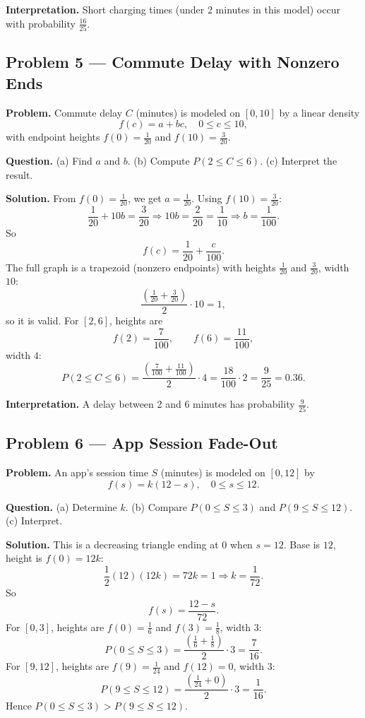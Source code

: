 \begin{ExamProblems}
\textbf{Interpretation.}
Short charging times (under 2 minutes in this model) occur with probability $\frac{16}{25}$.


\item
\subsection*{Problem 5 — Commute Delay with Nonzero Ends}

\textbf{Problem.}
Commute delay $C$ (minutes) is modeled on $[0,10]$ by a linear density
\[
f(c)=a+bc,\quad 0\le c\le 10,
\]
with endpoint heights $f(0)=\frac{1}{20}$ and $f(10)=\frac{3}{20}$.

\textbf{Question.}
(a) Find $a$ and $b$. (b) Compute $P(2\le C\le 6)$. (c) Interpret the result.

\textbf{Solution.}
From $f(0)=\frac{1}{20}$, we get $a=\frac{1}{20}$.
Using $f(10)=\frac{3}{20}$:
\[
\frac{1}{20}+10b=\frac{3}{20}\Rightarrow 10b=\frac{2}{20}=\frac{1}{10}\Rightarrow b=\frac{1}{100}.
\]
So
\[
f(c)=\frac{1}{20}+\frac{c}{100}.
\]
The full graph is a trapezoid (nonzero endpoints) with heights $\frac{1}{20}$ and $\frac{3}{20}$, width $10$:
\[
\frac{\left(\frac{1}{20}+\frac{3}{20}\right)}{2}\cdot 10=1,
\]
so it is valid.
For $[2,6]$, heights are
\[
f(2)=\frac{7}{100},\qquad f(6)=\frac{11}{100},
\]
width $4$:
\[
P(2\le C\le 6)=\frac{\left(\frac{7}{100}+\frac{11}{100}\right)}{2}\cdot 4
=\frac{18}{100}\cdot 2=\frac{9}{25}=0.36.
\]

\textbf{Interpretation.}
A delay between 2 and 6 minutes has probability $\frac{9}{25}$.


\item
\subsection*{Problem 6 — App Session Fade-Out}

\textbf{Problem.}
An app's session time $S$ (minutes) is modeled on $[0,12]$ by
\[
f(s)=k(12-s),\quad 0\le s\le 12.
\]

\textbf{Question.}
(a) Determine $k$. (b) Compare $P(0\le S\le 3)$ and $P(9\le S\le 12)$. (c) Interpret.

\textbf{Solution.}
This is a decreasing triangle ending at 0 when $s=12$.
Base is $12$, height is $f(0)=12k$:
\[
\frac12(12)(12k)=72k=1\Rightarrow k=\frac{1}{72}.
\]
So
\[
f(s)=\frac{12-s}{72}.
\]
For $[0,3]$, heights are $f(0)=\frac16$ and $f(3)=\frac18$, width $3$:
\[
P(0\le S\le 3)=\frac{\left(\frac16+\frac18\right)}{2}\cdot 3
=\frac{7}{16}.
\]
For $[9,12]$, heights are $f(9)=\frac{1}{24}$ and $f(12)=0$, width $3$:
\[
P(9\le S\le 12)=\frac{\left(\frac{1}{24}+0\right)}{2}\cdot 3
=\frac{1}{16}.
\]
Hence $P(0\le S\le 3)>P(9\le S\le 12)$.


\end{ExamProblems}

